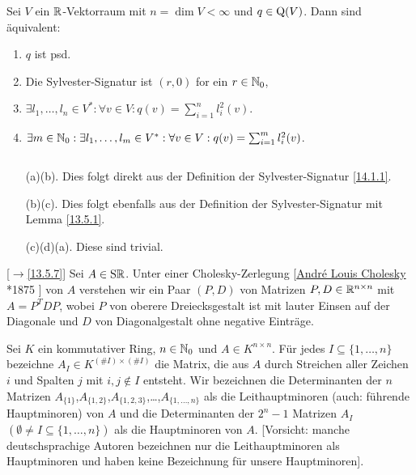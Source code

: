 \documentclass[../../main.tex]{subfiles}
\begin{document}
\begin{sat}\label{14.2.7}
    Sei $V$ ein $\mathbb R$-Vektorraum mit $n=\dim V<\infty$ und $q\in \operatorname{Q}(V)$. Dann sind äquivalent:
    \begin{enumerate}[\normalfont(a)]
        \item $q$ ist psd.
        \item Die Sylvester-Signatur ist $(r,0)$ for ein $r\in \mathbb N_0$,
        \item $\exists l_1,\ldots ,l_n\in V^*: \forall v\in V: q(v)=\sum_{i=1}^nl_i^2(v)$.
        \item $\exists m\in \mathbb N_0:\exists l_1,\ldots ,l_m\in V^*: \forall v\in V: q(v)=\sum_{i=1}^ml_i^2(v)$.
    \end{enumerate}
\end{sat}
\begin{cproof}
    $\;$
    \begin{itemize}
        \item[(a)\implies(b).] Dies folgt direkt aus der Definition der Sylvester-Signatur \ref{14.1.1}.
        \item[(b)\implies(c).] Dies folgt ebenfalls aus der Definition der Sylvester-Signatur mit Lemma \ref{13.5.1}.
        \item[(c)\implies(d)\implies(a).] Diese sind trivial.
    \end{itemize}
\end{cproof}

\begin{df}\mbox{}[$\to$\ref{13.5.7}]\label{14.2.8}
    Sei $A\in \operatorname{S\mathbb R}$. Unter einer Cholesky-Zerlegung [\href{https://en.wikipedia.org/wiki/Andre-Louis_Cholesky}{Andr\'{e} Louis Cholesky} *1875 ] von $A$ verstehen wir ein Paar $(P,D)$ von Matrizen $P,D\in \mathbb R^{n\times n}$ mit $A=P^TDP$, wobei $P$ von oberere Dreiecksgestalt ist mit lauter Einsen auf der Diagonale und $D$ von Diagonalgestalt ohne negative Einträge.
\end{df}

\begin{df}\label{14.2.9}
    Sei $K$ ein kommutativer Ring, $n\in \mathbb N_0$ und $A\in K^{n\times n}$. Für jedes $I\subseteq\{1,\ldots ,n\}$ bezeichne $A_I\in K^{(\#I)\times (\#I)}$ die Matrix, die aus $A$ durch Streichen aller Zeichen $i$ und Spalten $j$ mit $i,j\notin I$ entsteht. Wir bezeichnen die Determinanten der $n$ Matrizen $A_{\{1\}}$,$A_{\{1,2\}}$,$A_{\{1,2,3\}}$,\ldots ,$A_{\{1,\ldots ,n\}}$ als die Leithauptminoren (auch: führende Hauptminoren) von $A$ und die Determinanten der $2^{n}-1$ Matrizen $A_I$ $(\emptyset \neq I\subseteq\{1,\ldots ,n\})$ als die Hauptminoren von $A$. [Vorsicht: manche deutschsprachige Autoren bezeichnen nur die Leithauptminoren als Hauptminoren und haben keine Bezeichnung für unsere Hauptminoren].
\end{df}
\end{document}
